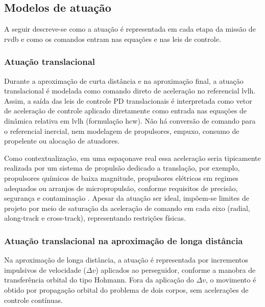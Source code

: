 \subsection{Modelos de atuação}
\label{subsec_modelos_atuacao}

A seguir descreve-se como a atuação é representada em cada etapa da missão de \gls{rvdb} e como os comandos entram nas equações e nas leis de controle.

\subsubsection{Atuação translacional}
\label{subsubsec_atuacao_translacional}

Durante a aproximação de curta distância e na aproximação final, a atuação translacional é modelada como comando direto de aceleração no referencial \gls{lvlh}.
Assim, a saída das leis de controle PD translacionais é interpretada como vetor de aceleração de controle aplicado diretamente como entrada nas equações de dinâmica relativa em \gls{lvlh} (formulação \gls{hcw}).
Não há conversão de comando para o referencial inercial, nem modelagem de propulsores, empuxo, consumo de propelente ou alocação de atuadores.

Como contextualização, em uma espaçonave real essa aceleração seria tipicamente realizada por um sistema de propulsão dedicado a translação, por exemplo, propulsores químicos de baixa magnitude, propulsores elétricos em regimes adequados ou arranjos de micropropulsão, conforme requisitos de precisão, segurança e contaminação \cite{wertz2011sme_smad}.
Apesar da atuação ser ideal, impõem-se limites de projeto por meio de saturação da aceleração de comando em cada eixo (radial, along-track e cross-track), representando restrições físicas.

\subsubsection{Atuação translacional na aproximação de longa distância}
\label{subsubsec_atuacao_translacional_longa}

Na aproximação de longa distância, a atuação é representada por incrementos impulsivos de velocidade ($\Delta v$) aplicados ao perseguidor, conforme a manobra de transferência orbital do tipo Hohmann.
Fora da aplicação do $\Delta v$, o movimento é obtido por propagação orbital do problema de dois corpos, sem acelerações de controle contínuas.


